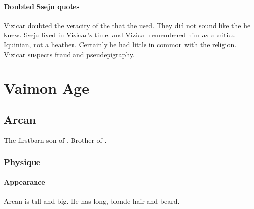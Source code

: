 \subsubsection{Doubted Sseju quotes}
Vizicar doubted the veracity of the  that the \Ortaicans used. 
They did not sound like the  he knew. 
Sseju lived in Vizicar's time, and Vizicar remembered him as a critical Iquinian, not a heathen. 
Certainly he had little in common with the \Ortaican religion. 
Vizicar suspects fraud and pseudepigraphy. 





























\chapter{Vaimon Age}
\section{Arcan \Delaen}
The firstborn son of . 
Brother of . 









\subsection{Physique}
\subsubsection{Appearance}
Arcan is tall and big. 
He has long, blonde hair and beard. 
















